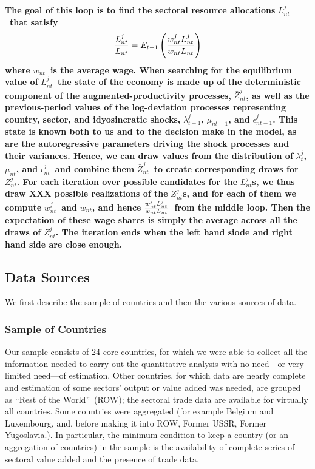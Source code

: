 \documentclass[12pt]{article}
\begin{document}
\textbf{The goal of this loop is to find the sectoral resource allocations }$%
L_{nt}^{j}$\textbf{\ that satisfy }%
\begin{equation*}
\frac{L_{nt}^{j}}{L_{nt}}=E_{t-1}\left( \frac{w_{nt}^{j}L_{nt}^{j}}{%
w_{nt}L_{nt}}\right)
\end{equation*}%
\textbf{where }$w_{nt}$\textbf{\ is the average wage. When searching for the
equilibrium value of }$L_{nt}^{j}$\textbf{\ the state of the economy is made
up of the deterministic component of the augmented-productivity processes, }$%
\bar{Z}_{nt}^{j}$\textbf{, as well as the previous-period values of the
log-deviation processes representing country, sector, and idyosincratic
shocks, }$\lambda _{t-1}^{j}$\textbf{, }$\mu _{nt-1}$\textbf{, and }$%
\epsilon _{nt-1}^{j}$\textbf{. This state is known both to us and to the
decision make in the model, as are the autoregressive parameters driving the
shock processes and their variances. Hence, we can draw values from the
distribution of }$\lambda _{t}^{j}$\textbf{, }$\mu _{nt}$\textbf{, and }$%
\epsilon _{nt}^{j}$\textbf{\ and combine them }$\bar{Z}_{nt}^{j}$\textbf{\
to create corresponding draws for }$Z_{nt}^{j}$\textbf{. For each iteration
over possible candidates for the }$L_{nt}^{j}$\textbf{s, we thus draw XXX
possible realizations of the }$Z_{nt}^{j}$\textbf{s, and for each of them we
compute }$w_{nt}^{j}$\textbf{\ and }$w_{nt}$\textbf{, and hence }$\frac{%
w_{nt}^{j}L_{nt}^{j}}{w_{nt}L_{nt}}$\textbf{\ from the middle loop. Then the
expectation of these wage shares is simply the average across all the draws
of }$Z_{nt}^{j}$\textbf{. The iteration ends when the left hand siode and
right hand side are close enough.}

\subsection*{Data Sources}

We first describe the sample of countries and then the various sources of
data.

\subsubsection*{Sample of Countries}

Our sample consists of 24 core countries, for which we were able to collect
all the information needed to carry out the quantitative analysis with no
need---or very limited need---of estimation. Other countries, for which data
are nearly complete and estimation of some sectors' output or value added
was needed, are grouped as \textquotedblleft Rest of the
World\textquotedblright\ (ROW); the sectoral trade data are available for
virtually all countries. Some countries were aggregated (for example Belgium
and Luxembourg, and, before making it into ROW, Former USSR, Former
Yugoslavia.). In particular, the minimum condition to keep a country (or an
aggregation of countries) in the sample is the availability of complete
series of sectoral value added and the presence of trade data.
\end{document}
